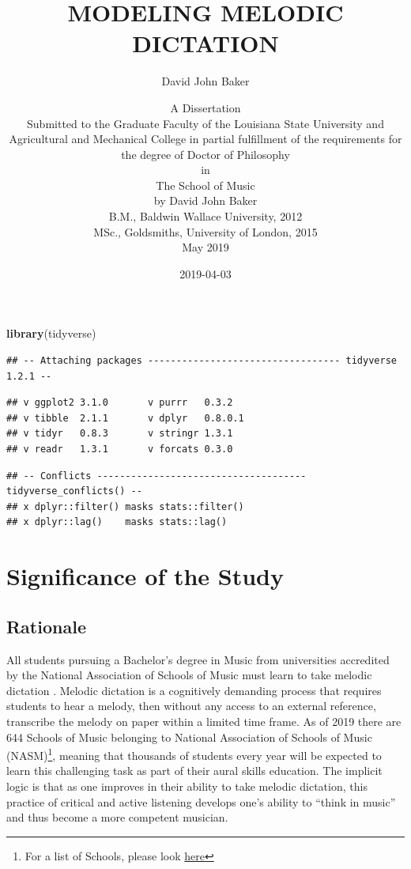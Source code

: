 \documentclass[]{book}
\title{MODELING MELODIC DICTATION}
\subtitle{David John Baker}
\author{A Dissertation \\ Submitted to the Graduate Faculty of the Louisiana State University and Agricultural and Mechanical College in partial fulfillment of the requirements for the degree of Doctor of Philosophy \\ in \\ The School of Music \\ by David John Baker \\ B.M., Baldwin Wallace University, 2012 \\ MSc., Goldsmiths, University of London, 2015 \\ May 2019}
\date{2019-04-03}
\newenvironment{Shaded}{\begin{snugshade}}{\end{snugshade}}
\newcommand{\KeywordTok}[1]{\textcolor[rgb]{0.13,0.29,0.53}{\textbf{#1}}}
\newcommand{\NormalTok}[1]{#1}
\let\rmarkdownfootnote\footnote%
\def\footnote{\protect\rmarkdownfootnote}
\begin{document}
\maketitle

{
\setcounter{tocdepth}{1}
\tableofcontents
}
\begin{Shaded}
\begin{Highlighting}[]
\KeywordTok{library}\NormalTok{(tidyverse)}
\end{Highlighting}
\end{Shaded}

\begin{verbatim}
## -- Attaching packages ---------------------------------- tidyverse 1.2.1 --
\end{verbatim}

\begin{verbatim}
## v ggplot2 3.1.0       v purrr   0.3.2  
## v tibble  2.1.1       v dplyr   0.8.0.1
## v tidyr   0.8.3       v stringr 1.3.1  
## v readr   1.3.1       v forcats 0.3.0
\end{verbatim}

\begin{verbatim}
## -- Conflicts ------------------------------------- tidyverse_conflicts() --
## x dplyr::filter() masks stats::filter()
## x dplyr::lag()    masks stats::lag()
\end{verbatim}

\hypertarget{significance-of-the-study}{%
\chapter{Significance of the Study}\label{significance-of-the-study}}

\hypertarget{rationale}{%
\section{Rationale}\label{rationale}}

All students pursuing a Bachelor's degree in Music from universities accredited by the National Association of Schools of Music must learn to take melodic dictation \citep[§VIII.6.B.2.A]{NationalAssociationSchools2018}.
Melodic dictation is a cognitively demanding process that requires students to hear a melody, then without any access to an external reference, transcribe the melody on paper within a limited time frame.
As of 2019 there are 644 Schools of Music belonging to National Association of Schools of Music (NASM)\footnote{For a list of Schools, please look \href{https://nasm.arts-accredit.org/directory-lists/accredited-institutions/search/?institutionname=\&city=\&state=\&country=\&search=true}{here}}, meaning that thousands of students every year will be expected to learn this challenging task as part of their aural skills education.
The implicit logic is that as one improves in their ability to take melodic dictation, this practice of critical and active listening develops one's ability to ``think in music'' \citep{bestMusicCurriculaFuture1992, karpinskiAuralSkillsAcquisition2000} and thus become a more competent musician.
\end{document}
